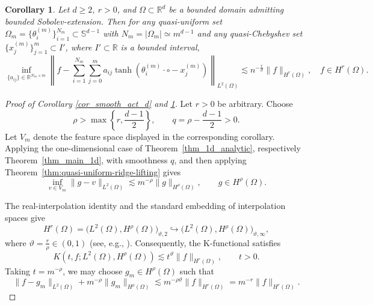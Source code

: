 \documentclass{article}
\numberwithin{equation}{section}
\newtheorem{corollary}{Corollary}
\def\RR{\mathbb{R}}
\def\SS{\mathbb{S}}
\def\lt{\left}
\def\rt{\right}
\begin{document}
\begin{corollary}\label{cor_tanh_d}
    Let $d\geq2$, $r>0$, and $\Omega\subset\RR^d$ be a bounded domain admitting bounded Sobolev-extension. Then for any quasi-uniform set $\Omega_m=\{\theta_i^{(m)}\}_{i=1}^{N_m}\subset \SS^{d-1}$ with $N_m=|\Omega_m|\simeq m^{d-1}$ and any quasi-Chebyshev set $\{x_j^{(m)}\}_{j=1}^{m}\subset I'$, where $I'\subset \RR$ is a bounded interval,
    \begin{equation}
        \inf\limits_{\{a_{ij}\}\in\RR^{N_m\times m}}\lt\|f - \sum_{i=1}^{N_m}\sum_{j=0}^m a_{ij}\tanh\lt(\theta_i^{(m)}\cdot\circ-x_j^{(m)}\rt)\rt\|_{L^2(\Omega)}\lesssim n^{-\frac{r}{d}} \|f\|_{H^r(\Omega)},\quad f\in H^r(\Omega).
    \end{equation}
\end{corollary}
\begin{proof}[Proof of Corollary \ref{cor_smooth_act_d} and \ref{cor_tanh_d}]
Let $r>0$ be arbitrary. Choose
$$
\rho>\max\left\{r,\frac{d-1}{2}\right\},
\qquad
q=\rho-\frac{d-1}{2}>0.
$$
Let $V_m$ denote the feature space displayed in the corresponding corollary. Applying the one-dimensional case of Theorem~\ref{thm_1d_analytic}, respectively Theorem~\ref{thm_main_1d}, with smoothness $q$, and then applying Theorem~\ref{thm:quasi-uniform-ridge-lifting} gives
\begin{equation}\label{eqn:high-smoothness-endpoint}
\inf_{v\in V_m}\|g-v\|_{L^2(\Omega)}
\lesssim
m^{-\rho}\|g\|_{H^\rho(\Omega)},
\qquad g\in H^\rho(\Omega).
\end{equation}

The real-interpolation identity and the standard embedding of interpolation spaces give
\begin{equation}\label{eqn:interpolation-identity-domain}
H^r(\Omega)
=
\bigl(L^2(\Omega),H^\rho(\Omega)\bigr)_{\vartheta,2}
\hookrightarrow
\bigl(L^2(\Omega),H^\rho(\Omega)\bigr)_{\vartheta,\infty},
\end{equation}
where $\vartheta=\frac{r}{\rho}\in(0,1)$ (see, e.g., \cite[Theorems~3.1.2 and~6.4.5]{bergh2012interpolation}). Consequently, the K-functional satisfies
\begin{equation}\label{eqn:k-functional-estimate}
K(t,f;L^2(\Omega),H^\rho(\Omega))
\lesssim
t^\vartheta\|f\|_{H^r(\Omega)},
\qquad t>0.
\end{equation}
Taking $t=m^{-\rho}$, we may choose $g_m\in H^\rho(\Omega)$ such that
\begin{equation}\label{eqn:smooth-intermediate-approximation}
\|f-g_m\|_{L^2(\Omega)}
+
m^{-\rho}\|g_m\|_{H^\rho(\Omega)}
\lesssim
m^{-\rho\vartheta}\|f\|_{H^r(\Omega)}
=
m^{-r}\|f\|_{H^r(\Omega)}.
\end{equation}


\end{proof}
\end{document}
